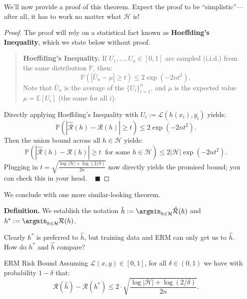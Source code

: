 We'll now provide a proof of this theorem.
Expect the proof to be ``simplistic''---after all,
it has to work no matter what $\mathcal{H}$ is!

\begin{proof}
    The proof will rely on a statistical fact
    known as \textbf{Hoeffding's Inequality},
    which we state below without proof.
    \begin{quote}
        \textbf{Hoeffding's Inequality.}
        If $U_1, \dots, U_n \in [0, 1]$ are
        sampled (i.i.d.) from the same distribution $\mathbb{P}$, then:
        \[
        \mathbb{P}\left(
            \left|\bar{U}_n - \mu\right| \geq t
        \right) \leq 2 \exp\left(-2nt^2\right).
        \]
        Note that $\bar{U}_n$ is the average of the $\{U_i\}_{i = 1}^n$,
        and $\mu$ is the expected value $\mu = \mathbb{E}[U_i]$
        (the same for all $i$).
    \end{quote}
    Directly applying Hoeffding's Inequality
    with $U_i := \mathcal{L}(h(x_i), y_i)$ yields:
    \[ \mathbb{P}\left(
    \left|\hat{\mathcal{R}}(h) - \mathcal{R}(h)\right| \geq t
    \right) \leq 2\exp\left(-2nt^2\right). \]
    Then the union bound across all $h \in \mathcal{H}$ yields:
    \[ \mathbb{P}\left(
    \left|\hat{\mathcal{R}}(h) - \mathcal{R}(h)\right| \geq t
    ~ \text{ for some } h \in \mathcal{H}
    \right) \leq 2|\mathcal{H}|\exp\left(-2nt^2\right). \]
    Plugging in $t = \sqrt{\frac{\log|\mathcal{H}| + \log(2/\delta)}{2n}}$
    now directly yields the promised bound;
    you can check this in your head. ~ $\blacksquare$
\end{proof}

We conclude with one more similar-looking theorem.

\textbf{Definition.}
We establish the notation
$\hat{h} := \argmin_{h \in \mathcal{H}} \hat{\mathcal{R}}(h)$
and $h^* := \argmin_{h \in \mathcal{H}} \mathcal{R}(h)$.

Clearly $h^*$ is preferred to $\hat{h}$,
but training data and ERM can only get us to $\hat{h}$.
How do $h^*$ and $\hat{h}$ compare?

\begin{theorem}{ERM Risk Bound}
    Assuming $\mathcal{L}(x, y) \in [0, 1]$,
    for all $\delta \in (0, 1)$
    we have with probability $1 - \delta$ that:
    \[
    \mathcal{R}(\hat{h}) - \mathcal{R}(h^*)
    \leq 2 \cdot 
    \sqrt{\frac{\log |\mathcal{H}| + \log\left(2 / \delta\right)}{2n}}.
    \]
\end{theorem}

